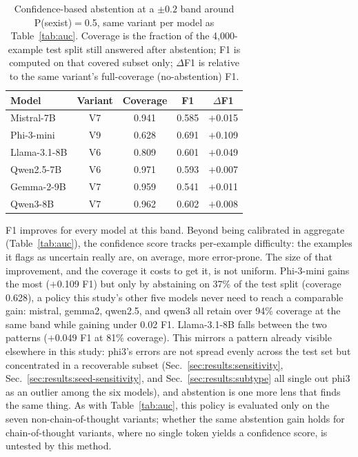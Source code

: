 \begin{table}[t]
\centering
\footnotesize
\caption{Confidence-based abstention at a $\pm0.2$ band around
P(sexist)$=$0.5, same variant per model as Table~\ref{tab:auc}. Coverage
is the fraction of the 4{,}000-example test split still answered after
abstention; F1 is computed on that covered subset only; $\Delta$F1 is
relative to the same variant's full-coverage (no-abstention) F1.}
\label{tab:abstention}
\begin{tabular}{lcccc}
\toprule
Model & Variant & Coverage & F1 & $\Delta$F1 \\
\midrule
Mistral-7B & V7 & 0.941 & 0.585 & $+$0.015 \\
Phi-3-mini & V9 & 0.628 & 0.691 & $+$0.109 \\
Llama-3.1-8B & V6 & 0.809 & 0.601 & $+$0.049 \\
Qwen2.5-7B & V6 & 0.971 & 0.593 & $+$0.007 \\
Gemma-2-9B & V7 & 0.959 & 0.541 & $+$0.011 \\
Qwen3-8B & V7 & 0.962 & 0.602 & $+$0.008 \\
\bottomrule
\end{tabular}
\end{table}

F1 improves for every model at this band. Beyond being calibrated in
aggregate (Table~\ref{tab:auc}), the confidence score tracks
per-example difficulty: the examples it flags as uncertain really are,
on average, more error-prone. The size of that improvement, and the
coverage it costs to get it, is not uniform. Phi-3-mini gains the most
($+$0.109 F1) but only by abstaining on 37\% of the test split (coverage
0.628), a policy this study's other five models never need to reach a
comparable gain: mistral, gemma2, qwen2.5, and qwen3 all retain over
94\% coverage at the same band while gaining under 0.02 F1. Llama-3.1-8B
falls between the two patterns ($+$0.049 F1 at 81\% coverage). This
mirrors a pattern already visible elsewhere in this study: phi3's errors
are not spread evenly across the test set but concentrated in a
recoverable subset (Sec.~\ref{sec:results:sensitivity},
Sec.~\ref{sec:results:seed-sensitivity}, and
Sec.~\ref{sec:results:subtype} all single out phi3 as an outlier among
the six models), and abstention is one more lens that finds the same
thing. As with Table~\ref{tab:auc}, this policy is evaluated only on the
seven non-chain-of-thought variants; whether the same abstention gain
holds for chain-of-thought variants, where no single token yields a
confidence score, is untested by this method.
